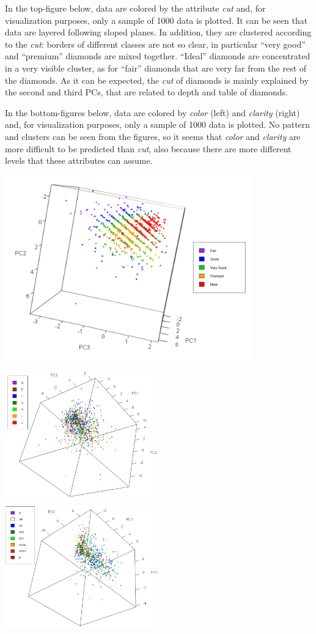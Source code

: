 \documentclass[
]{article}
\begin{document}
In the top-figure below, data are colored by the attribute \emph{cut}
and, for visualization purposes, only a sample of 1000 data is plotted.
It can be seen that data are layered following sloped planes. In
addition, they are clustered according to the \emph{cut}: borders of
different classes are not so clear, in particular ``very good'' and
``premium'' diamonds are mixed together. ``Ideal'' diamonds are
concentrated in a very visible cluster, as for ``fair'' diamonds that
are very far from the rest of the diamonds. As it can be expected, the
\emph{cut} of diamonds is mainly explained by the second and third PCs,
that are related to depth and table of diamonds.

In the bottom-figures below, data are colored by \emph{color} (left) and
\emph{clarity} (right) and, for visualization purposes, only a sample of
1000 data is plotted. No pattern and clusters can be seen from the
figures, so it seems that \emph{color} and \emph{clarity} are more
difficult to be predicted than \emph{cut}, also because there are more
different levels that these attributes can assume.

\includegraphics[width=0.8\textwidth,height=\textheight]{Images/PC_Image.png}

\includegraphics[width=0.5\textwidth,height=\textheight]{Images/PCcolor_Image.png}
\includegraphics[width=0.5\textwidth,height=\textheight]{Images/PCclarity_Image.png}
\end{document}
